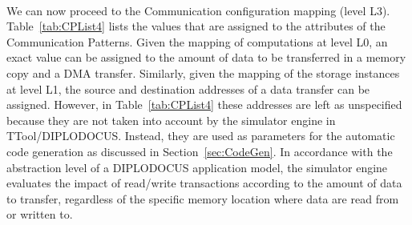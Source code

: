 \documentclass{llncs}
\begin{document}
%
\\We can now proceed to the Communication configuration mapping (level L3). Table~\ref{tab:CPList4} lists the values
that are assigned to the attributes of the Communication Patterns. Given the mapping of computations at level L0, an
exact value can be assigned to the amount of data to be transferred in a memory copy and a DMA transfer. Similarly,
given the mapping of the storage instances at level L1, the source and destination addresses of a data transfer can be
assigned. However, in Table~\ref{tab:CPList4} these addresses are left as unspecified because they are not taken into
account by the simulator engine in TTool/DIPLODOCUS. Instead, they are used as parameters for the automatic code
generation as discussed in Section~\ref{sec:CodeGen}. In accordance with the abstraction level of a DIPLODOCUS application
model, the simulator engine evaluates the impact of read/write transactions according to the amount of data to transfer,
regardless of the specific memory location where data are read from or written to.
%
\end{document}
